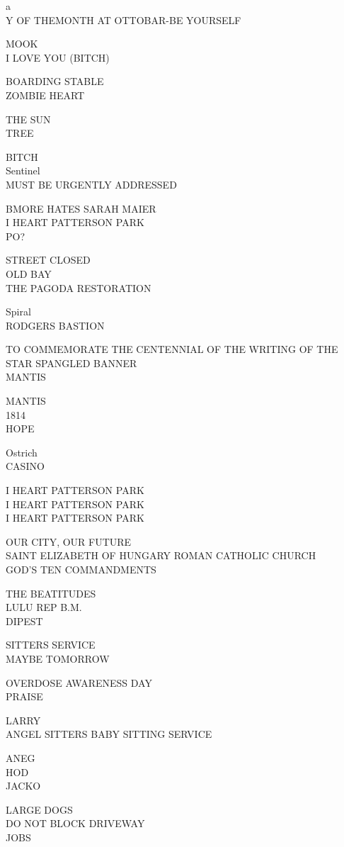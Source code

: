 \documentclass[10pt,letterpaper]{article}
\begin{document}
a\\
Y OF THEMONTH AT OTTOBAR{-}BE YOURSELF

MOOK\\
I LOVE YOU (BITCH)

BOARDING STABLE\\
ZOMBIE HEART

THE SUN\\
TREE

BITCH\\
Sentinel\\
MUST BE URGENTLY ADDRESSED

BMORE HATES SARAH MAIER\\
I HEART PATTERSON PARK\\
PO?

STREET CLOSED\\
OLD BAY\\
THE PAGODA RESTORATION

Spiral\\
RODGERS BASTION

TO COMMEMORATE THE CENTENNIAL OF THE WRITING OF THE STAR SPANGLED BANNER\\
MANTIS

MANTIS\\
1814\\
HOPE

Ostrich\\
CASINO

I HEART PATTERSON PARK\\
I HEART PATTERSON PARK\\
I HEART PATTERSON PARK

OUR CITY, OUR FUTURE\\
SAINT ELIZABETH OF HUNGARY ROMAN CATHOLIC CHURCH\\
GOD'S TEN COMMANDMENTS

THE BEATITUDES\\
LULU REP B.M.\\
DIPEST

SITTERS SERVICE\\
MAYBE TOMORROW

OVERDOSE AWARENESS DAY\\
PRAISE

LARRY\\
ANGEL SITTERS BABY SITTING SERVICE

ANEG\\
HOD\\
JACKO

LARGE DOGS\\
DO NOT BLOCK DRIVEWAY\\
JOBS
\end{document}
